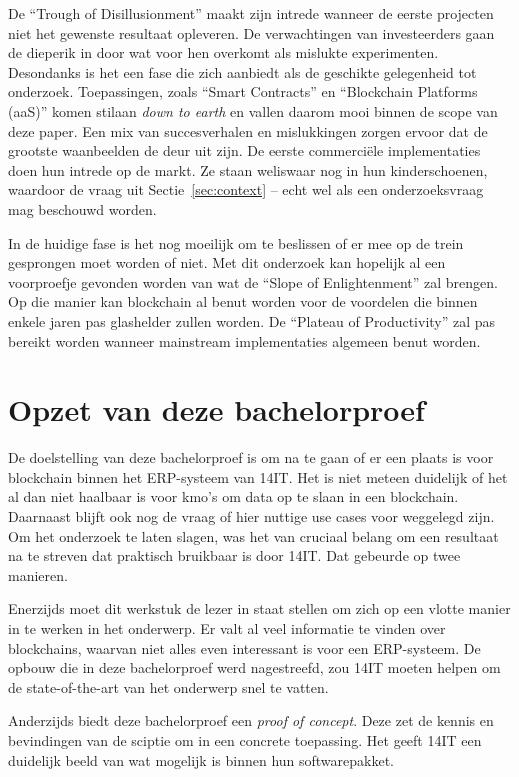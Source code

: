 De ``Trough of Disillusionment'' maakt zijn intrede wanneer de eerste projecten niet het gewenste resultaat opleveren.
De verwachtingen van investeerders gaan de dieperik in door wat voor hen overkomt als mislukte experimenten. Desondanks is het een fase die zich aanbiedt als de geschikte gelegenheid tot onderzoek. Toepassingen, zoals ``Smart Contracts'' en ``Blockchain Platforms (aaS)'' komen stilaan \textit{down to earth} en vallen daarom mooi binnen de scope van deze paper. Een mix van succesverhalen en mislukkingen zorgen ervoor dat de grootste waanbeelden de deur uit zijn. De eerste commerciële implementaties doen hun intrede op de markt. Ze staan weliswaar nog in hun kinderschoenen, waardoor de vraag uit Sectie~\ref{sec:context} --  echt wel als een onderzoeksvraag mag beschouwd worden. 

In de huidige fase is het nog moeilijk om te beslissen of er mee op de trein gesprongen moet worden of niet. Met dit onderzoek kan hopelijk al een voorproefje gevonden worden van wat de ``Slope of Enlightenment'' zal brengen. Op die manier kan blockchain al benut worden voor de voordelen die binnen enkele jaren pas glashelder zullen worden. De ``Plateau of Productivity'' zal pas bereikt worden wanneer mainstream implementaties algemeen benut worden.

\newpage

\section{Opzet van deze bachelorproef}
\label{sec:opzet-van-deze-bachelorproef}


De doelstelling van deze bachelorproef is om na te gaan of er een plaats is voor blockchain binnen het ERP-systeem van 14IT. Het is niet meteen duidelijk of het al dan niet haalbaar is voor kmo's om data op te slaan in een blockchain. Daarnaast blijft ook nog de vraag of hier nuttige use cases voor weggelegd zijn. Om het onderzoek te laten slagen, was het van cruciaal belang om een resultaat na te streven dat praktisch bruikbaar is door 14IT. Dat gebeurde op twee manieren. 

Enerzijds moet dit werkstuk de lezer in staat stellen om zich op een vlotte manier in te werken in het onderwerp. Er valt al veel informatie te vinden over blockchains, waarvan niet alles even interessant is voor een ERP-systeem. De opbouw die in deze bachelorproef werd nagestreefd, zou 14IT moeten helpen om de state-of-the-art van het onderwerp snel te vatten.

Anderzijds biedt deze bachelorproef een \textit{proof of concept}. Deze zet de kennis en bevindingen van de sciptie om in een concrete toepassing. Het geeft 14IT een duidelijk beeld van wat mogelijk is binnen hun softwarepakket.

